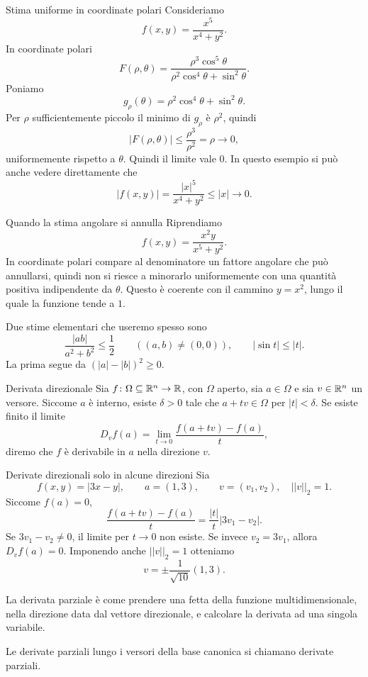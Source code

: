 \documentclass[a4paper]{article}
\begin{document}
\begin{radioactive}
\begin{snippetexample}{Stima uniforme in coordinate polari}
    Consideriamo
    \[
        f(x,y)=\frac{x^5}{x^4+y^2}.
    \]
    In coordinate polari
    \[
        F(\rho,\theta)
        =\frac{\rho^3\cos^5\theta}{\rho^2\cos^4\theta+\sin^2\theta}.
    \]
    Poniamo
    \[
        g_\rho(\theta)=\rho^2\cos^4\theta+\sin^2\theta.
    \]
    Per \(\rho\) sufficientemente piccolo il minimo di \(g_\rho\) è \(\rho^2\), quindi
    \[
        |F(\rho,\theta)|
        \leq \frac{\rho^3}{\rho^2}=\rho\to0,
    \]
    uniformemente rispetto a \(\theta\). Quindi il limite vale \(0\).
    In questo esempio si può anche vedere direttamente che
    \[
        |f(x,y)|
        =\frac{|x|^5}{x^4+y^2}
        \leq |x|\to0.
    \]
\end{snippetexample}

\begin{snippetexample}{Quando la stima angolare si annulla}
    Riprendiamo
    \[
        f(x,y)=\frac{x^2y}{x^5+y^2}.
    \]
    In coordinate polari compare al denominatore un fattore angolare che può annullarsi,
    quindi non si riesce a minorarlo uniformemente con una quantità positiva indipendente
    da \(\theta\). Questo è coerente con il cammino \(y=x^2\), lungo il quale la funzione tende a \(1\).
\end{snippetexample}

Due stime elementari che useremo spesso sono
\[
    \frac{|ab|}{a^2+b^2}\leq\frac12
    \qquad ((a,b)\neq(0,0)),
    \qquad
    |\sin t|\leq|t|.
\]
La prima segue da \((|a|-|b|)^2\geq0\).

\begin{snippetdefinition}{Derivata direzionale}
    Sia \(f\colon\Omega\subseteq\mathbb{R}^n\to\mathbb{R}\), con \(\Omega\) aperto,
    sia \(a\in\Omega\) e sia \(v\in\mathbb{R}^n\) un versore. Siccome \(a\) è interno,
    esiste \(\delta>0\) tale che \(a+tv\in\Omega\) per \(|t|<\delta\).
    Se esiste finito il limite
    \[
        D_v f(a)=\lim_{t\to0}\frac{f(a+tv)-f(a)}{t},
    \]
    diremo che \(f\) è derivabile in \(a\) nella direzione \(v\).
\end{snippetdefinition}

\begin{snippetexample}{Derivate direzionali solo in alcune direzioni}
    Sia
    \[
        f(x,y)=|3x-y|,
        \qquad a=(1,3),
        \qquad v=(v_1,v_2),\quad ||v||_2=1.
    \]
    Siccome \(f(a)=0\),
    \[
        \frac{f(a+tv)-f(a)}{t}
        =\frac{|t|}{t}|3v_1-v_2|.
    \]
    Se \(3v_1-v_2\neq0\), il limite per \(t\to0\) non esiste. Se invece
    \(v_2=3v_1\), allora \(D_vf(a)=0\). Imponendo anche \(||v||_2=1\) otteniamo
    \[
        v=\pm\frac{1}{\sqrt{10}}(1,3).
    \]
\end{snippetexample}

La derivata parziale è come prendere una fetta della funzione multidimensionale,
nella direzione data dal vettore direzionale, e calcolare la derivata ad una singola variabile.

Le derivate parziali lungo i versori della base canonica si chiamano derivate parziali.
\end{radioactive}
\end{document}
